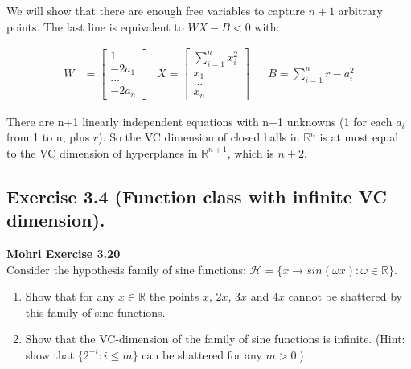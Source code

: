 \documentclass[
10pt, %
a4paper, %
oneside, %
headinclude,footinclude, %
BCOR5mm, %
]{scrartcl}
\newenvironment{problem}[2][]
               { \begin{mdframed}[backgroundcolor=gray!20] \textbf{#1 #2} \\}
               {  \end{mdframed}}
\begin{document}
We will show that there are enough free variables to capture $n+1$ arbitrary points. The last line is equivalent to $WX - B < 0$ with:

\begin{align*}
  W &= \begin{bmatrix}
    1 \\
    -2a_1 \\
    ... \\
    -2a_n
   \end{bmatrix} & X = \begin{bmatrix}
     \sum_{i=1}^n x_i^2 \\
     x_1 \\
     ... \\
     x_n
   \end{bmatrix} &&  B = \sum_{i=1}^n r - a_i^2
\end{align*}

There are n+1 linearly independent equations with n+1 unknowns (1 for each $a_i$ from 1 to n, plus $r$). So the VC dimension of closed balls in $\mathbb{R}^n$ is at most equal to the VC dimension of hyperplanes in $\mathbb{R}^{n+1}$, which is $n+2$.

\subsection*{Exercise 3.4 (Function class with infinite VC dimension).}
\begin{problem}{Mohri Exercise 3.20}
Consider the hypothesis family of sine functions: $\mathcal{H} = \{x \to sin(\omega x): \omega \in \mathbb{R}\}$.
\begin{enumerate}[label=(\alph*)]
\item Show that for any $x \in \mathbb{R}$ the points $x$, $2x$, $3x$ and $4x$ cannot be shattered by this family of sine functions.
\item Show that the VC-dimension of the family of sine functions is infinite. (Hint: show that $\{2^{-i}: i \leq m\}$ can be shattered for any $m > 0$.)
\end{enumerate}
\end{problem}
\end{document}
